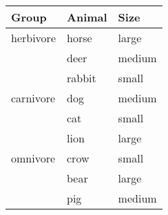 \documentclass{article}
\begin{document}
\begin{tabular}{lll}
  \toprule
  Group     & Animal & Size   \\
  \midrule
  herbivore & horse  & large  \\
            & deer   & medium \\
            & rabbit & small  \\
  \addlinespace
  carnivore & dog    & medium \\
            & cat    & small  \\
            & lion   & large  \\
  \addlinespace
  omnivore  & crow   & small  \\
            & bear   & large  \\
            & pig    & medium \\
  \bottomrule
\end{tabular}
\end{document}
